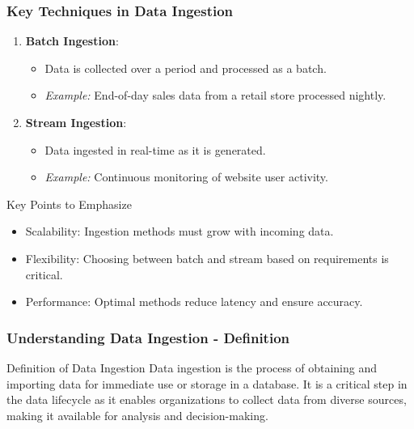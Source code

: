 \documentclass{beamer}
\begin{document}
\begin{frame}[fragile]
    \frametitle{Key Techniques in Data Ingestion}
    \begin{enumerate}
        \item \textbf{Batch Ingestion}:
            \begin{itemize}
                \item Data is collected over a period and processed as a batch.
                \item \textit{Example:} End-of-day sales data from a retail store processed nightly.
            \end{itemize}
        \item \textbf{Stream Ingestion}:
            \begin{itemize}
                \item Data ingested in real-time as it is generated.
                \item \textit{Example:} Continuous monitoring of website user activity.
            \end{itemize}
    \end{enumerate}
    
    \begin{block}{Key Points to Emphasize}
        \begin{itemize}
            \item Scalability: Ingestion methods must grow with incoming data.
            \item Flexibility: Choosing between batch and stream based on requirements is critical.
            \item Performance: Optimal methods reduce latency and ensure accuracy.
        \end{itemize}
    \end{block}
\end{frame}

\begin{frame}[fragile]
    \frametitle{Understanding Data Ingestion - Definition}
    \begin{block}{Definition of Data Ingestion}
        Data ingestion is the process of obtaining and importing data for immediate use or storage in a database. 
        It is a critical step in the data lifecycle as it enables organizations to collect data from diverse sources, making it available for analysis and decision-making.
    \end{block}
\end{frame}
\end{document}
